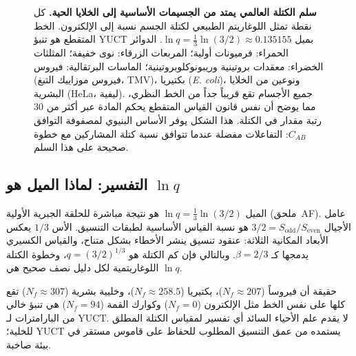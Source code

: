 \documentclass[11pt,a4paper]{article}
\begin{document}
\begin{figure}[H]
\begin{otherlanguage}{english}
		\end{otherlanguage}
		\caption{\textbf{سلم الكتلة العالمي يمتد من الجسيمات الأساسية إلى الخلايا الحية.}
			كل نقطة تمثل اللوغاريتم الطبيعي لكتلة الجسم نسبة إلى الإلكترون.
			الخط المتقطع هو تنبؤ YUCT بميل \(\ln q = \frac{1}{3}\ln(3/2) \approx 0.135155\).
			الدوائر الحمراء: فرميونات أولية؛ المربعات الزرقاء: نوى خفيفة؛ المثلثات الخضراء: معقدات بروتينية وريبونوكلوبروتينية؛ الماسات البرتقالية: فيروس (فيروس موزاييك التبغ، TMV)، بكتيريا (\textit{E. coli})، ونوعين من الخلايا البشرية (HeLa، ليفية).
			جميع الأجسام تقع قريباً جداً من الخط النظري، مما يوضح أن نفس قانون القياس المتقطع يحكم المادة عبر أكثر من 30 رتبة مقدار في الكتلة.
			هذا الشكل يوفر الأساس البنيوي لمصفوفة التوافق \(C_{AB}\): التفاعلات مفضلة عندما تتوافق نسبة كتلة المشاركين مع خطوة صحيحة على هذا السلم.}
		\label{fig:ladder_cells}
	\end{figure}
	
	\subsection{التفسير: لماذا الميل هو \(\ln q\)}
	
	الميل \(\ln q = \frac{1}{3}\ln(3/2)\) هو نتيجة مباشرة للحلقة الجبرية الأولية (ملحق~AF). عامل الأجيال \(3/2 = S_{\mathrm{odd}}/S_{\mathrm{even}}\) هو نسبة القياس الأساسية لطبقات التنسيق. الأس \(1/3\) يعكس الأبعاد المكانية الثلاثة: عنقود تنسيق ينشر الأخطاء بشكل متناح، والقياس الكسيري يدمجها كـ \(\beta = 2/3\). وبالتالي فإن كم الكتلة هو \(q = (3/2)^{1/3}\)، وخطوة الكتلة اللوغاريتمية لكل دليل نصف صحيح هي \(\ln q\).
	
	حقيقة أن فيروساً (\(N_f \approx 207\))، بكتيريا (\(N_f \approx 258.5\))، وخليية بشرية (\(N_f \approx 307\)) تقع كلها على نفس الخط مثل الإلكترون (\(N_f = 0\)) وكوارك القمة (\(N_f = 94\)) هي تنبؤ خالي من البارامترات لـ YUCT. لا يقدم علم الأحياء السائد أي تفسير لمقياس الكتلة المطلق للخلية؛ YUCT يستمده من عمق التنسيق المطلوب للحفاظ على قاموس مستقر في بيئة صاخبة.
	
\end{document}
